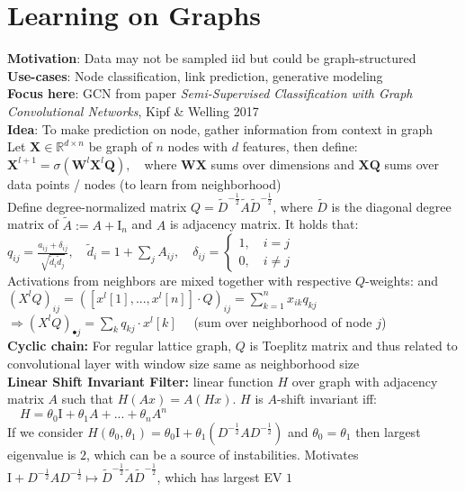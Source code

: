\section*{Learning on Graphs}
\textbf{Motivation}: Data may not be sampled iid but could be graph-structured\\
\textbf{Use-cases}: Node classification, link prediction, generative modeling\\
\textbf{Focus here}: GCN from paper \textit{Semi-Supervised Classification with Graph Convolutional Networks}, Kipf \& Welling 2017\\
\textbf{Idea}: To make prediction on node, gather information from context in graph\\
Let $\mathbf X\in\mathbb R^{d\times n}$ be graph of $n$ nodes with $d$ features, then define:\\
$\mathbf X^{l+1}=\sigma(\mathbf W^l\mathbf X^l \mathbf Q),\quad $where $\mathbf{WX}$ sums over dimensions and $\mathbf{XQ}$ sums over data points / nodes (to learn from neighborhood)\\
Define degree-normalized matrix $Q=\tilde D^{-\frac{1}{2}}\tilde A\tilde D^{-\frac{1}{2}}$, where $\tilde D$ is the diagonal degree matrix of $\tilde A:=A+\mathrm I_n$ and $A$ is adjacency matrix. It holds that:\\
$q_{ij}=\frac{a_{ij}+\delta_{ij}}{\sqrt{\tilde d_{i}\tilde d_j}}, \quad \tilde d_i=1+\sum_j A_{ij}, \quad \delta_{ij}=\begin{cases} 1, \quad i=j \\ 0, \quad i\neq j\end{cases}$\\
Activations from neighbors are mixed together with respective $Q$-weights: and $(X^lQ)_{ij}=([x^l[1],...,x^l[n]]\cdot Q)_{ij}=\sum_{k=1}^nx_{ik}q_{kj}$\\
$\Rightarrow (X^lQ)_{\bullet j}=\sum_{k}q_{kj}\cdot x^l[k]\quad$ (sum over neighborhood of node $j$)\\
\textbf{Cyclic chain:} For regular lattice graph, $Q$ is Toeplitz matrix and thus related to convolutional layer with window size same as neighborhood size\\
\textbf{Linear Shift Invariant Filter:} linear function $H$ over graph with adjacency matrix $A$ such that $H(Ax)=A(Hx)$. $H$ is $A$-shift invariant iff: $\quad H=\theta_0\mathrm I+\theta_1A+...+\theta_nA^n$\\
If we consider $H(\theta_0,\theta_1)=\theta_0\mathrm I+\theta_1(D^{-\frac{1}{2}}AD^{-\frac{1}{2}})$ and $\theta_0=\theta_1$ then largest eigenvalue is $2$, which can be a source of instabilities. Motivates $\mathrm I + D^{-\frac{1}{2}}AD^{-\frac{1}{2}}\mapsto \tilde D^{-\frac{1}{2}}\tilde A\tilde D^{-\frac{1}{2}}$, which has largest EV $1$ 